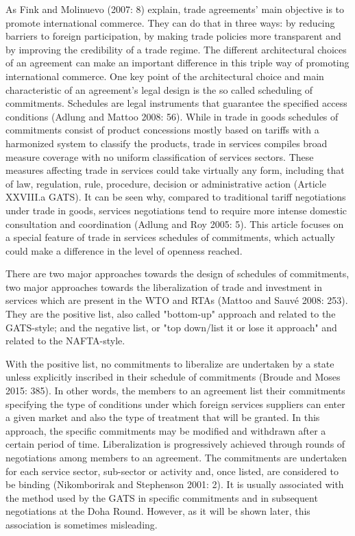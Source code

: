 \documentclass{article}
\begin{document}
As Fink and Molinuevo (2007: 8) explain, trade agreements’ main objective is to promote international commerce. They can do that in three ways: by reducing barriers to foreign participation, by making trade policies more transparent and by improving the credibility of a trade regime. The different architectural choices of an agreement can make an important difference in this triple way of promoting international commerce. One key point of the architectural choice and main characteristic of an agreement’s legal design is the so called scheduling of commitments. Schedules are legal instruments that guarantee the specified access conditions (Adlung and Mattoo 2008: 56). While in trade in goods schedules of commitments consist of product concessions mostly based on tariffs with a harmonized system to classify the products, trade in services compiles broad measure coverage with no uniform classification of services sectors. These measures affecting trade in services could take virtually any form, including that of law, regulation, rule, procedure, decision or administrative action (Article XXVIII.a GATS). It can be seen why, compared to traditional tariff negotiations under trade in goods, services negotiations tend to require more intense domestic consultation and coordination (Adlung and Roy 2005: 5). This article focuses on a special feature of trade in services schedules of commitments, which actually could make a difference in the level of openness reached.

\smallskip

There are two major approaches towards the design of schedules of commitments, two major approaches towards the liberalization of trade and investment in services which are present in the WTO and RTAs (Mattoo and Sauvé 2008: 253). They are the positive list, also called "bottom-up" approach and related to the GATS-style; and the negative list, or "top down/list it or lose it approach" and related to the NAFTA-style.

\smallskip

With the positive list, no commitments to liberalize are undertaken by a state unless explicitly inscribed in their schedule of commitments (Broude and Moses 2015: 385). In other words, the members to an agreement list their commitments specifying the type of conditions under which foreign services suppliers can enter a given market and also the type of treatment that will be granted. In this approach, the specific commitments may be modified and withdrawn after a certain period of time. Liberalization is progressively achieved through rounds of negotiations among members to an agreement. The commitments are undertaken for each service sector, sub-sector or activity and, once listed, are considered to be binding (Nikomborirak and Stephenson 2001: 2). It is usually associated with the method used by the GATS in specific commitments and in subsequent negotiations at the Doha Round. However, as it will be shown later, this association is sometimes misleading.
\end{document}
